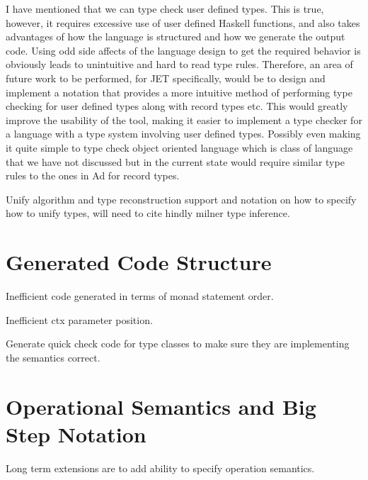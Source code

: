 I have mentioned that we can type check user defined types.
This is true, however, it requires excessive use of user defined Haskell functions, and also takes advantages of how the language is structured and how we generate the output code.
Using odd side affects of the language design to get the required behavior is obviously leads to unintuitive and hard to read type rules.
Therefore, an area of future work to be performed, for JET specifically, would be to design and implement a notation that provides a more intuitive method of performing type checking for user defined types along with record types etc.
This would greatly improve the usability of the tool, making it easier to implement a type checker for a language with a type system involving user defined types.
Possibly even making it quite simple to type check object oriented language which is class of language that we have not discussed but in the current state would require similar type rules to the ones in Ad for record types.

Unify algorithm and type reconstruction support and notation on how to specify how to unify types, will need to cite hindly milner type inference.

\section{Generated Code Structure}
Inefficient code generated in terms of monad statement order.

Inefficient ctx parameter position.

Generate quick check code for type classes to make sure they are implementing the semantics correct.

\section{Operational Semantics and Big Step Notation}
Long term extensions are to add ability to specify operation semantics.
